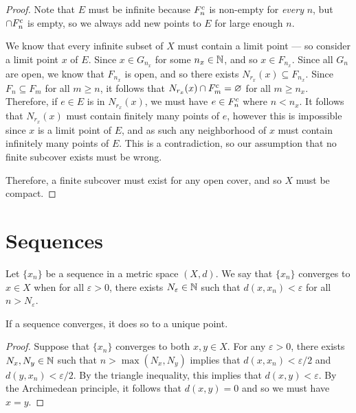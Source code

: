 \begin{proof}
    Note that $E$ must be infinite because $F_n^{c}$ is non-empty for \emph{every} $n$, but $\cap F_n^{c}$ is empty, so we always add new points to $E$ for large enough $n$.

    We know that every infinite subset of $X$ must contain a limit point --- so consider a limit point $x$ of $E$. Since $x \in G_{n_{x}}$ for some $n_x \in \mathbb{N}$, and so $x \in F_{n_x}$. Since all $G_n$ are open, we know that $F_{n_x}$ is open, and so there exists $N_{r_x}(x) \subseteq F_{n_x}$. Since $F_n \subseteq F_m$ for all $m \geq n$, it follows that $N_{r_x}(x) \cap F_{m}^{c} = \varnothing$ for all $m \geq n_x$. Therefore, if $e \in E$ is in $N_{r_x}(x)$, we must have $e \in F_n^{c}$ where $n < n_x$. It follows that $N_{r_x}(x)$ must contain finitely many points of $e$, however this is impossible since $x$ is a limit point of $E$, and as such any neighborhood of $x$ must contain infinitely many points of $E$. This is a contradiction, so our assumption that no finite subcover exists must be wrong.

    Therefore, a finite subcover must exist for any open cover, and so $X$ must be compact.
\end{proof}

\section{Sequences}

\begin{defn}
    Let $\{x_n\}$ be a sequence in a metric space $(X, d)$. We say that $\{x_n\}$ converges to $x \in X$ when for all $\varepsilon > 0$, there exists $N_{\varepsilon} \in \mathbb{N}$ such that $d(x, x_n) < \varepsilon$ for all $n > N_{\varepsilon}$.
\end{defn}

\begin{prop}
    If a sequence converges, it does so to a unique point.
\end{prop}

\begin{proof}
    Suppose that $\{x_n\}$ converges to both $x, y \in X$. For any $\varepsilon > 0$, there exists $N_x, N_y \in \mathbb{N}$ such that $n > \max(N_x, N_y)$ implies that $d(x, x_n) < \varepsilon/2$ and $d(y, x_n) < \varepsilon/2$. By the triangle inequality, this implies that $d(x, y) < \varepsilon$. By the Archimedean principle, it follows that $d(x, y) = 0$ and so we must have $x = y$.
\end{proof}

